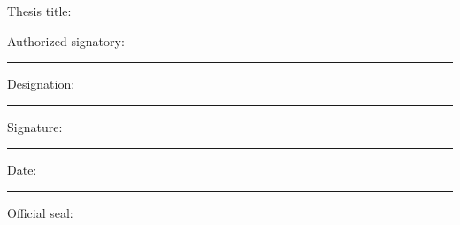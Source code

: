 ﻿
\vspace{2cm}
\noindent Thesis title: \emph{\PUThesisTitle}


\vspace{2cm}
\noindent Authorized signatory:\ \rule{8cm}{0.4pt}


\vspace{0.9cm}
\noindent Designation:\ \rule{8cm}{0.4pt}


\vspace{0.9cm}
\noindent Signature:\ \rule{6cm}{0.4pt}


\vspace{0.9cm}
\noindent Date:\ \rule{5cm}{0.4pt}


\vspace{1.0cm}
\noindent Official seal: